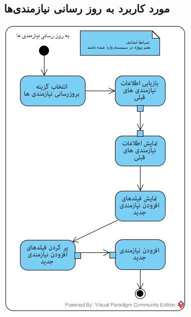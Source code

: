 \newpage
\vspace{2cm}
\subsection*{مورد کاربرد به روز رسانی نیازمندی‌ها}
\vspace{2cm}
\begin{center}
\includegraphics[width=\textwidth]{ActivityDiagrams/24.jpg}
\end{center}

\newpage
\vspace{2cm}
